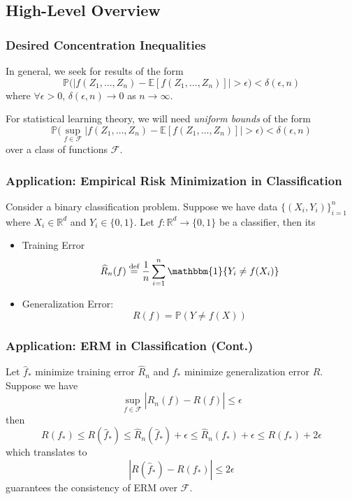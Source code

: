 \documentclass{beamer}
\begin{document}

\subsection{High-Level Overview} 
\begin{frame}
\frametitle{Desired Concentration Inequalities} 

In general, we seek for results of the form 
$$ \mathbb{P}\bigg( \big| f(Z_1, \dots, Z_n) - \mathbb{E}[f(Z_1, \dots, Z_n)] \big| > \epsilon \bigg) < \delta(\epsilon, n) $$
where $\forall \epsilon > 0$, $\delta(\epsilon, n) \rightarrow 0 $ as $n \rightarrow \infty$. 

For statistical learning theory, we will need \textit{uniform bounds} of the form
$$ \mathbb{P}\bigg( \sup_{f \in \mathcal{F}} \big| f(Z_1, \dots, Z_n) - \mathbb{E}[f(Z_1, \dots, Z_n)] \big| > \epsilon \bigg) < \delta(\epsilon, n) $$
over a class of functions $\mathcal{F}$. 

\end{frame}


\begin{frame}
\frametitle{Application: Empirical Risk Minimization in Classification} 

Consider a binary classification problem. Suppose we have data $\{(X_i, Y_i)\}_{i=1}^{n}$ where $X_i \in \mathbb{R}^d$ and $Y_i \in \{0,1\}$. Let $f: \mathbb{R}^d \rightarrow \{0,1\}$ be a classifier, then its 
\begin{itemize}
    \item Training Error $$ \widehat{R}_{n}(f) \stackrel{\text{def}}{=} \frac{1}{n}\sum_{i=1}^{n} \mathbbm{1}\{ Y_i \neq f(X_i) \} $$ 
    \item Generalization Error: $$ R(f) = \mathbb{P}(Y \neq f(X)) $$
\end{itemize}

\end{frame}


\begin{frame}
\frametitle{Application: ERM in Classification (Cont.)} 

Let $\widehat{f}_{*}$ minimize training error $\widehat{R}_{n}$ and $f_{*}$ minimize generalization error $R$. Suppose we have 
$$ \sup_{f \in \mathcal{F}} | \widehat{R}_{n}(f) - R(f) | \leq \epsilon $$
then
$$ R(f_{*}) \leq R(\widehat{f}_{*}) \leq \widehat{R}_{n}(\widehat{f}_{*}) + \epsilon \leq \widehat{R}_{n}(f_{*}) + \epsilon \leq R(f_{*}) + 2\epsilon $$
which translates to 
$$ | R(\widehat{f}_{*}) - R(f_{*}) | \leq 2\epsilon $$
guarantees the consistency of ERM over $\mathcal{F}$. 

\end{frame}
\end{document}
